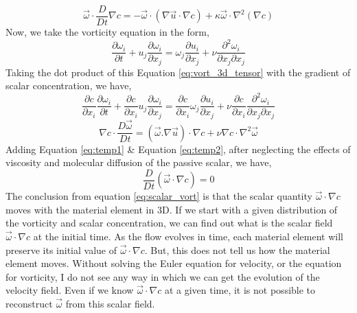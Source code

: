 \documentclass{article}
\begin{document}
\begin{equation}\label{eq:temp1}
\vec{\omega} \cdot \frac{D}{Dt}\nabla c=- \vec{\omega} \cdot (\nabla \vec{u} \cdot \nabla c) + \kappa \vec{\omega} \cdot \nabla^2 (\nabla c)
\end{equation}
Now, we take the vorticity equation in the form,
\begin{equation} \label{eq:vort_3d_tensor}
\frac{\partial \omega_i}{\partial t}+u_j \frac{\partial \omega_i}{\partial x_j} = \omega_j \frac{\partial u_i}{\partial x_j} + \nu \frac{\partial ^2 \omega_i}{\partial x_j \partial x_j}
\end{equation}
Taking the dot product of this Equation \eqref{eq:vort_3d_tensor} with the gradient of scalar concentration, we have,
\begin{equation}
\frac{\partial c}{\partial x_i} \frac{\partial \omega_i}{\partial t}+\frac{\partial c}{\partial x_i} u_j \frac{\partial \omega_i}{\partial x_j} = \frac{\partial c}{\partial x_i} \omega_j \frac{\partial u_i}{\partial x_j} + \nu \frac{\partial c}{\partial x_i} \frac{\partial^2 \omega_i }{\partial x_j \partial x_j}
\end{equation}
\begin{equation}\label{eq:temp2}
\nabla c \cdot \frac{D \vec{\omega}}{Dt}= \left(\vec{\omega}.\nabla \vec{u}\right)\cdot \nabla c + \nu \nabla c \cdot \nabla ^2\vec{\omega}
\end{equation}
Adding Equation \eqref{eq:temp1} \& Equation \eqref{eq:temp2}, after neglecting the effects of viscosity and molecular diffusion of the passive scalar, we have,
\begin{equation}\label{eq:scalar_vort}
\frac{D}{Dt}(\vec{\omega} \cdot \nabla c) = 0
\end{equation}
The conclusion from equation \eqref{eq:scalar_vort} is that the scalar quantity $\vec{\omega}\cdot \nabla c$ moves with the material element in 3D. If we start with a given distribution of the vorticity and scalar concentration, we can find out what is the scalar field $\vec{\omega}\cdot \nabla c$ at the initial time. As the flow evolves in time, each material element will preserve its initial value of $\vec{\omega}\cdot \nabla c$. But, this does not tell us how the material element moves. Without solving the Euler equation for velocity, or the equation for vorticity, I do not see any way in which we can get the evolution of the velocity field. Even if we know $\vec{\omega}\cdot \nabla c$ at a given time, it is not possible to reconstruct $\vec{\omega}$ from this scalar field.

\end{document}
